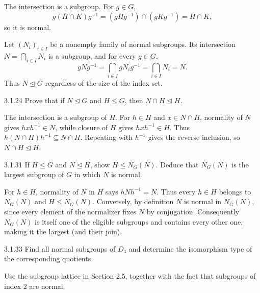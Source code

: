 \documentclass[11pt,oneside]{article}
\begin{document}
\begin{solution}
\begin{exercisesubparts}
\item The intersection is a subgroup. For $g\in G$,
\[
 g(H\cap K)g^{-1}=(gHg^{-1})\cap(gKg^{-1})=H\cap K,
\]
so it is normal.
\item Let $(N_i)_{i\in I}$ be a nonempty family of normal subgroups. Its intersection $N=\bigcap_{i\in I}N_i$ is a subgroup, and for every $g\in G$,
\[
 gNg^{-1}=\bigcap_{i\in I}gN_ig^{-1}=\bigcap_{i\in I}N_i=N.
\]
Thus $N\trianglelefteq G$ regardless of the size of the index set.
\end{exercisesubparts}
\end{solution}

\begin{exercise}{3.1.24}
Prove that if $N\trianglelefteq G$ and $H\le G$, then $N\cap H\trianglelefteq H$.
\end{exercise}

\begin{solution}
The intersection is a subgroup of $H$. For $h\in H$ and $x\in N\cap H$, normality of $N$ gives $hxh^{-1}\in N$, while closure of $H$ gives $hxh^{-1}\in H$. Thus $h(N\cap H)h^{-1}\subseteq N\cap H$. Repeating with $h^{-1}$ gives the reverse inclusion, so $N\cap H\trianglelefteq H$.
\end{solution}

\begin{exercise}{3.1.31}
If $H\le G$ and $N\trianglelefteq H$, show $H\le N_G(N)$. Deduce that $N_G(N)$ is the largest subgroup of $G$ in which $N$ is normal.
\end{exercise}

\begin{solution}
For $h\in H$, normality of $N$ in $H$ says $hNh^{-1}=N$. Thus every $h\in H$ belongs to $N_G(N)$ and $H\le N_G(N)$. Conversely, by definition $N$ is normal in $N_G(N)$, since every element of the normalizer fixes $N$ by conjugation. Consequently $N_G(N)$ is itself one of the eligible subgroups and contains every other one, making it the largest (and their join).
\end{solution}

\begin{exercise}{3.1.33}
Find all normal subgroups of $D_4$ and determine the isomorphism type of the corresponding quotients.
\end{exercise}

\begin{hint}
Use the subgroup lattice in Section 2.5, together with the fact that subgroups of index $2$ are normal.
\end{hint}
\end{document}
